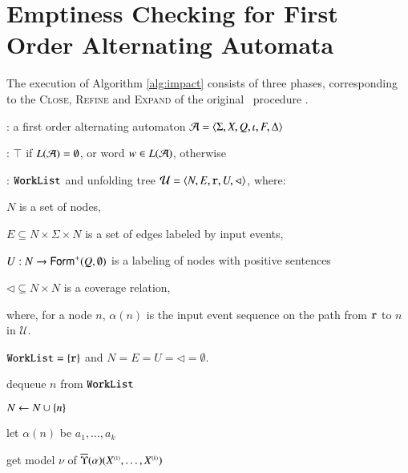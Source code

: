 \section{Emptiness Checking for First Order Alternating Automata}
\label{app:algorithm}

The execution of Algorithm \ref{alg:impact} consists of three phases,
corresponding to the \textsc{Close}, \textsc{Refine} and
\textsc{Expand} of the original \impact\ procedure \cite{McMillan06}.

\begin{algorithm}[htb]
\begin{algorithmic}[0] : a first order
  alternating automaton $\mathcal{A} = \langle \Sigma,X,Q,\iota,F,\Delta \rangle$
  
  : $\top$ if $L(\mathcal{A})=\emptyset$, or word $w \in
  L(\mathcal{A})$, otherwise

  : $\mathtt{WorkList}$ and unfolding tree
  $\mathcal{U} = \langle N,E,\mathtt{r},U,\lhd \rangle$,
  where: \begin{compactitem}
  \item $N$ is a set of nodes,
  \item $E \subseteq N \times \Sigma \times N$ is a set of edges labeled by input events,
  \item $U : N \rightarrow \mathsf{Form}^+(Q,\emptyset)$ is a labeling of
    nodes with positive sentences
  \item $\lhd \subseteq N \times N$ is a coverage relation,
  \end{compactitem}
  \State where, for a node $n$, $\alpha(n)$ is the input event
  sequence on the path from $\mathtt{r}$ to $n$ in $\mathcal{U}$.

   $\mathtt{WorkList} = \{ \mathtt{r} \}$ and
  $N=E=U=\lhd=\emptyset$.
\end{algorithmic}
\begin{algorithmic}[1]   
  \While{$\worklist \neq \emptyset$}
  \label{ln:impact-while}

  \State dequeue $n$ from $\mathtt{WorkList}$ 
  \label{ln:impact-dequeue}

  \State $N \leftarrow N \cup \{ n \}$

  \State let $\alpha(n)$ be $a_1, \ldots, a_k$


  \State get model $\nu$ of $\overline{\Upsilon}({\alpha})({X}^{\scriptscriptstyle{({1})}}, \ldots, {X}^{\scriptscriptstyle{({k})}})$


\end{algorithmic}
\end{algorithm}
